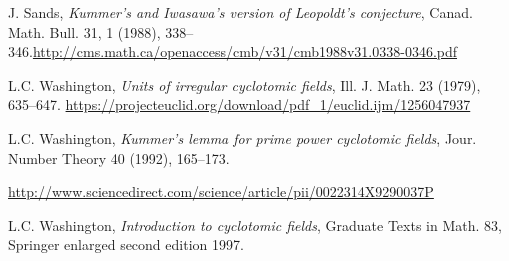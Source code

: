 \documentclass[12pt]{amsart}
\theoremstyle{definition}
\numberwithin{equation}{section}
\begin{document}
\begin{thebibliography}{HD}
 J. Sands,  {\it Kummer's and Iwasawa's version of Leopoldt's conjecture}, Canad.
Math. Bull. 31, 1 (1988), 338--346.\url{http://cms.math.ca/openaccess/cmb/v31/cmb1988v31.0338-0346.pdf}

  L.C. Washington,  {\it Units of irregular cyclotomic fields},  
Ill. J. Math. 23 (1979), 635--647.
\url{https://projecteuclid.org/download/pdf_1/euclid.ijm/1256047937}

  L.C. Washington,  {\it Kummer's lemma for prime power cyclotomic fields}, 
Jour. Number Theory 40 (1992), 165--173.

\url{http://www.sciencedirect.com/science/article/pii/0022314X9290037P}

 L.C. Washington, {\it Introduction to cyclotomic fields}, 
Graduate Texts in Math. 83, Springer enlarged second edition 1997.

\end{thebibliography}
\end{document}
